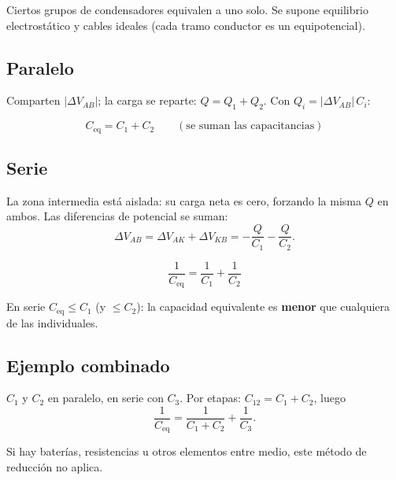 \documentclass[12pt,a4paper]{article}
\begin{document}
Ciertos grupos de condensadores equivalen a uno solo. Se supone
equilibrio electrostático y cables ideales (cada tramo conductor es un
equipotencial).

\subsection{Paralelo}

Comparten $|\Delta V_{AB}|$; la carga se reparte: $Q = Q_1 + Q_2$. Con
$Q_i = |\Delta V_{AB}|\,C_i$:

\begin{keybox}[Paralelo]
  \[
  \boxed{C_{\text{eq}} = C_1 + C_2}
  \qquad (\text{se suman las capacitancias})
  \]
\end{keybox}

\subsection{Serie}

La zona intermedia está aislada: su carga neta es cero, forzando la misma
$Q$ en ambos. Las diferencias de potencial se suman:
\[
\Delta V_{AB} = \Delta V_{AK} + \Delta V_{KB} = -\frac{Q}{C_1} - \frac{Q}{C_2}.
\]

\begin{keybox}[Serie]
  \[
  \boxed{\frac{1}{C_{\text{eq}}} = \frac{1}{C_1} + \frac{1}{C_2}}
  \]
\end{keybox}

\begin{notebox}[Consecuencia]
  En serie $C_{\text{eq}} \leq C_1$ (y $\leq C_2$): la capacidad
  equivalente es \textbf{menor} que cualquiera de las individuales.
\end{notebox}



\subsection{Ejemplo combinado}

$C_1$ y $C_2$ en paralelo, en serie con $C_3$. Por etapas:
$C_{12} = C_1 + C_2$, luego
\[
\frac{1}{C_{\text{eq}}} = \frac{1}{C_1 + C_2} + \frac{1}{C_3}.
\]

\begin{warnbox}
  Si hay baterías, resistencias u otros elementos entre medio, este método
  de reducción no aplica.
\end{warnbox}


\end{document}

